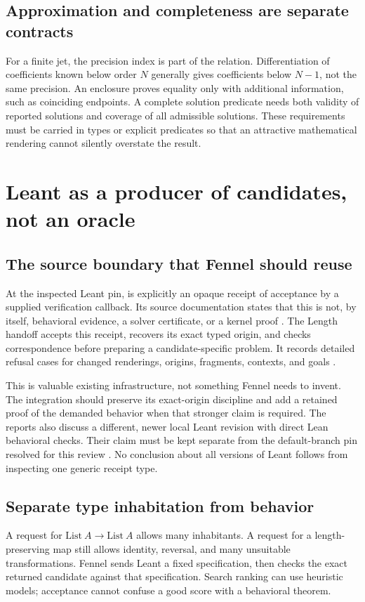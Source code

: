 \documentclass[11pt,a4paper]{article}
\theoremstyle{definition}
\theoremstyle{remark}
\newcommand{\code}[1]{\texttt{\detokenize{#1}}}
\begin{document}
\subsection{Approximation and completeness are separate contracts}
For a finite jet, the precision index is part of the relation. Differentiation
of coefficients known below order $N$ generally gives coefficients below
$N-1$, not the same precision. An enclosure proves equality only with additional
information, such as coinciding endpoints. A complete solution predicate needs
both validity of reported solutions and coverage of all admissible solutions.
These requirements must be carried in types or explicit predicates so that an
attractive mathematical rendering cannot silently overstate the result.

\section{Leant as a producer of candidates, not an oracle}
\label{sec:leant}

\subsection{The source boundary that Fennel should reuse}
At the inspected Leant pin, \code{Verified} is explicitly an opaque receipt of
acceptance by a supplied verification callback. Its source documentation
states that this is not, by itself, behavioral evidence, a solver certificate,
or a kernel proof \cite{leantV}. The Length handoff accepts this receipt,
recovers its exact typed origin, and checks correspondence before preparing a
candidate-specific problem. It records detailed refusal cases for changed
renderings, origins, fragments, contexts, and goals \cite{leantH}.

This is valuable existing infrastructure, not something Fennel needs to invent.
The integration should preserve its exact-origin discipline and add a retained
proof of the demanded behavior when that stronger claim is required. The
reports also discuss a different, newer local Leant revision with direct Lean
behavioral checks. Their claim must be kept separate from the default-branch
pin resolved for this review \cite{synA,synB}. No conclusion about all versions
of Leant follows from inspecting one generic receipt type.

\subsection{Separate type inhabitation from behavior}
A request for $\mathrm{List}\ A\to\mathrm{List}\ A$ allows many inhabitants.
A request for a length-preserving map still allows identity, reversal, and
many unsuitable transformations. Fennel sends Leant a fixed specification,
then checks the exact returned candidate against that specification. Search
ranking can use heuristic models; acceptance cannot confuse a good score with
a behavioral theorem.
\end{document}
